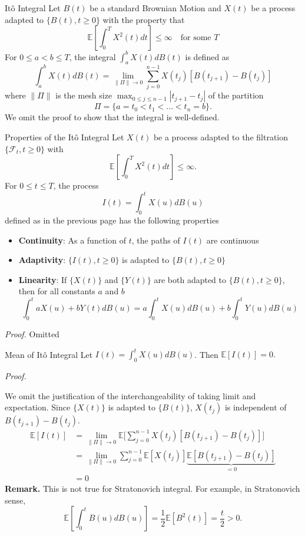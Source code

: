 \documentclass[letterpaper,handout]{beamer}
\def\Sum{\sum\nolimits}
\def\E{\mathbb E}
\def\F{\mathcal{F}}
\begin{document}
\begin{frame}{It\^{o} Integral}
Let $B(t)$ be a standard Brownian Motion and $X(t)$ be a process adapted to $\{B(t),t\ge 0\}$ with the property that
$$\E\left[\int_0^T X^2(t)dt\right]\le \infty\quad\mbox{for some }T$$
For $0\le a<b\le T$, the integral $\int_a^b X(t)d B(t)$ is defined as
$$\int_a^b X(t)d B(t)=\lim_{\|\Pi\|\to 0}\sum_{j=0}^{n-1}X(t_j)[B(t_{j+1})-B(t_j)]$$
where $\|\Pi\|$ is the mesh size $\displaystyle\max_{0\le j\le n-1}|t_{j+1}-t_j|$ of the partition $$\Pi =\{a=t_0<t_1<\ldots<t_n=b\}.$$
We omit the proof to show that the integral is well-defined.
\end{frame}
\begin{frame}{Properties of the It\^{o} Integral}
Let $X(t)$ be a process adapted to the filtration $\{\F_t,t\ge 0\}$ with
$$\E\left[\int_0^T X^2(t)dt\right]\le \infty.$$
For $0\le t\le T$, the process
$$I(t)=\int_0^t X(u)d B(u)$$
defined as in the previous page has the following properties
\begin{itemize}
\item {\bf Continuity}: As a function of $t$, the paths of $I(t)$ are continuous
\item {\bf Adaptivity}: $\{I(t),t\ge 0\}$ is adapted to $\{B(t),t\ge 0\}$
\item {\bf Linearity}: If $\{X(t)\}$ and $\{Y(t)\}$ are both adapted to $\{B(t),t\ge 0\}$,
then for all constants $a$ and $b$
$$\int_0^t aX(u)+bY(t)d B(u)=a\int_0^t X(u)d B(u)+b\int_0^t Y(u)d B(u)$$
\end{itemize}
{\em Proof.} Omitted
\end{frame}
\begin{frame}{Mean of It\^{o} Integral}
Let $I(t)=\int_0^t X(u)d B(u)$. Then $\E[I(t)]=0.$\bigskip

{\em Proof.}

We omit the justification of the interchangeability of taking limit and expectation.
Since $\{X(t)\}$ is adapted to $\{B(t)\}$, $X(t_j)$ is independent of $B(t_{j+1})-B(t_j)$.
\begin{align*}
\E[I(t)]&=\lim_{\|\Pi\|\to 0}\E\Big[\Sum_{j=0}^{n-1}X(t_j)[B(t_{j+1})-B(t_j)]\Big]\\
&=\lim_{\|\Pi\|\to 0}\sum_{j=0}^{n-1}\E[X(t_j)]\underbrace{\E[B(t_{j+1})-B(t_j)]}_{=0}\\
&=0
\end{align*}
{\bf Remark.} This is not true for Stratonovich integral. For example, in Stratonovich sense,
$$\E\left[\int_0^t B(u) dB(u)\right]=\frac{1}{2}\E[B^2(t)]=\frac{t}{2}>0.$$
\end{frame}
\end{document}

